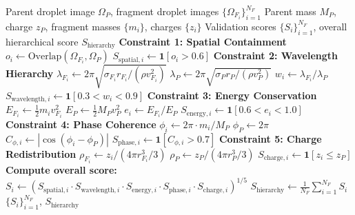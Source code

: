 \documentclass[11pt,twocolumn]{article}
\begin{document}
\begin{algorithm}[h]
\caption{Hierarchical Constraint Validation}
\label{alg:hierarchy}
\begin{algorithmic}[1]
\Require Parent droplet image $\Omega_P$, fragment droplet images $\{\Omega_{F_i}\}_{i=1}^{N_F}$
\Require Parent mass $M_P$, charge $z_P$, fragment masses $\{m_i\}$, charges $\{z_i\}$
\Ensure Validation scores $\{S_i\}_{i=1}^{N_F}$, overall hierarchical score $S_{\text{hierarchy}}$
    \State \textbf{Constraint 1: Spatial Containment}
    \State $o_i \gets \text{Overlap}(\Omega_{F_i}, \Omega_P)$ 
    \State $S_{\text{spatial}, i} \gets \mathbf{1}[o_i > 0.6]$ 
    \State \textbf{Constraint 2: Wavelength Hierarchy}
    \State $\lambda_{F_i} \gets 2\pi\sqrt{\sigma_{F_i} r_{F_i} / (\rho v_{F_i}^2)}$ 
    \State $\lambda_P \gets 2\pi\sqrt{\sigma_P r_P / (\rho v_P^2)}$ 
    \State $w_i \gets \lambda_{F_i} / \lambda_P$ 
    \State $S_{\text{wavelength}, i} \gets \mathbf{1}[0.3 < w_i < 0.9]$
    \State \textbf{Constraint 3: Energy Conservation}
    \State $E_{F_i} \gets \frac{1}{2} m_i v_{F_i}^2$ 
    \State $E_P \gets \frac{1}{2} M_P v_P^2$ 
    \State $e_i \gets E_{F_i} / E_P$ 
    \State $S_{\text{energy}, i} \gets \mathbf{1}[0.6 < e_i < 1.0]$
    \State \textbf{Constraint 4: Phase Coherence}
    \State $\phi_i \gets 2\pi \cdot m_i / M_P$ 
    \State $\phi_P \gets 2\pi$ 
    \State $C_{\phi, i} \gets |\cos(\phi_i - \phi_P)|$ 
    \State $S_{\text{phase}, i} \gets \mathbf{1}[C_{\phi, i} > 0.7]$
    \State \textbf{Constraint 5: Charge Redistribution}
    \State $\rho_{F_i} \gets z_i / (4\pi r_{F_i}^3 / 3)$ 
    \State $\rho_P \gets z_P / (4\pi r_P^3 / 3)$ 
    \State $S_{\text{charge}, i} \gets \mathbf{1}[z_i \leq z_P]$ 
    \State \textbf{Compute overall score:}
    \State $S_i \gets (S_{\text{spatial}, i} \cdot S_{\text{wavelength}, i} \cdot S_{\text{energy}, i} \cdot S_{\text{phase}, i} \cdot S_{\text{charge}, i})^{1/5}$
\EndFor
\State $S_{\text{hierarchy}} \gets \frac{1}{N_F} \sum_{i=1}^{N_F} S_i$ 
\State \Return $\{S_i\}_{i=1}^{N_F}$, $S_{\text{hierarchy}}$
\end{algorithmic}
\end{algorithm}
\end{document}
